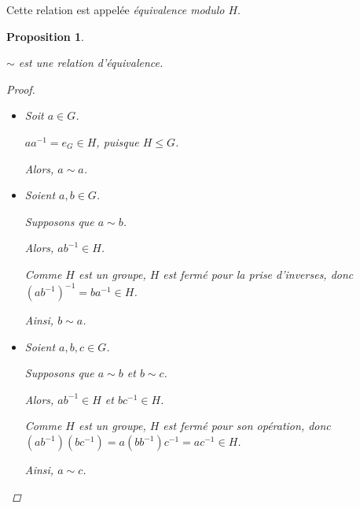 \documentclass{report}
\newcommand*{\lte}{\leqslant}
\newtheorem*{prop}{Proposition}
\theoremstyle{definition}
\theoremstyle{remark}
\begin{document}
	Cette relation est appel\'ee \emph{\'equivalence modulo $H$}.
	\begin{prop}~

		$\sim$ est une relation d'\'equivalence.
		\begin{proof}~

			\begin{itemize}
				\item[(refl)] Soit $a \in G$.

				$aa^{-1} = e_G \in H$, puisque $H \lte G$.

				Alors, $a \sim a$.
				\item[(sym)] Soient $a,b \in G$.

				Supposons que $a \sim b$.

				Alors, $ab^{-1} \in H$.

				Comme $H$ est un groupe, $H$ est ferm\'e pour la prise d'inverses, donc $(ab^{-1})^{-1} = ba^{-1} \in H$.

				Ainsi, $b \sim a$.
				\item[(trans)] Soient $a,b,c \in G$.

				Supposons que $a \sim b$ et $b \sim c$.

				Alors, $ab^{-1} \in H$ et $bc^{-1} \in H$.

				Comme $H$ est un groupe, $H$ est ferm\'e pour son op\'eration, donc $\left( ab^{-1} \right) \left( bc^{-1} \right) = a \left( bb^{-1} \right) c^{-1} = ac^{-1} \in H$.

				Ainsi, $a \sim c$.
			\end{itemize}
		\end{proof}
	\end{prop}
\end{document}

